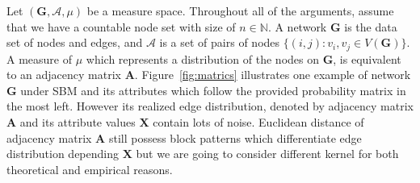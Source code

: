 \documentclass[12pt]{article}
\theoremstyle{definition}
\begin{document}
Let $(\mathbf{G}, \mathcal{A}, \mu)$ be a measure space. Throughout all of the arguments, assume that we have a countable node set with size of $n \in \mathbb{N}$. A network $\boldsymbol{G}$ is the data set of nodes and edges, and $\mathcal{A}$ is a set of pairs of nodes $\{(i,j) : v_{i}, v_{j} \in V(\boldsymbol{G}) \}$. A measure of $\mu$ which represents a distribution of the nodes on $\boldsymbol{G}$, is equivalent to an adjacency matrix $\boldsymbol{A}$. Figure~\ref{fig:matrics} illustrates one example of network $\mathbf{G}$ under SBM and its attributes which follow the provided probability matrix in the most left. However its realized edge distribution, denoted by adjacency matrix $\mathbf{A}$ and its attribute values $\mathbf{X}$ contain lots of noise. Euclidean distance of adjacency matrix $\mathbf{A}$ still possess block patterns which differentiate edge distribution depending $\mathbf{X}$ but we are going to consider different kernel for both theoretical and empirical reasons. 
	
\end{document}
